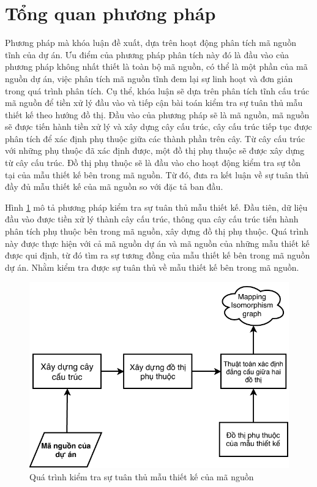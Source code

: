 \documentclass[12pt]{report}
\begin{document}
\section{Tổng quan phương pháp}
Phương pháp mà khóa luận đề xuất, dựa trên hoạt động phân tích mã nguồn tĩnh của dự án. Ưu điểm của phương pháp phân tích này đó là đầu vào của phương pháp không nhất thiết là toàn bộ mã nguồn, có thể là một phần của mã nguồn dự án, việc phân tích mã nguồn tĩnh đem lại sự linh hoạt và đơn giản trong quá trình phân tích. Cụ thể, khóa luận sẽ dựa trên phân tích tĩnh cấu trúc mã nguồn để tiền xử lý đầu vào và tiếp cận bài toán kiểm tra sự tuân thủ mẫu thiết kế theo hướng đồ thị.
Đầu vào của phương pháp sẽ là mã nguồn, mã nguồn sẽ được tiến hành tiền xử lý và xây dựng cây cấu trúc, cây cấu trúc tiếp tục được phân tích để xác định phụ thuộc giữa các thành phần trên cây. Từ cây cấu trúc với những phụ thuộc đã xác định được, một đồ thị phụ thuộc sẽ được xây dựng từ cây cấu trúc. Đồ thị phụ thuộc sẽ là đầu vào cho hoạt động kiểm tra sự tồn tại của mẫu thiết kế bên trong mã nguồn. Từ đó, đưa ra kết luận về sự tuân thủ đầy đủ mẫu thiết kế của mã nguồn so với đặc tả ban đầu.

\noindent Hình \ref{fig:general_architecture} mô tả phương pháp kiểm tra sự tuân thủ mẫu thiết kế. Đầu tiên, dữ liệu đầu vào được tiền xử lý thành cây cấu trúc, thông qua cây cấu trúc tiến hành phân tích phụ thuộc bên trong mã nguồn, xây dựng đồ thị phụ thuộc. Quá trình này được thực hiện với cả mã nguồn dự án và mã nguồn của những mẫu thiết kế được qui định, từ đó tìm ra sự tương đồng của mẫu thiết kế bên trong mã nguồn dự án. Nhằm kiểm tra được sự tuân thủ về mẫu thiết kế bên trong mã nguồn.
\begin{figure}[h]
	\centering
	\includegraphics[scale=1.1]{images/general_architecture_3_1_2}
	\caption{Quá trình kiểm tra sự tuân thủ mẫu thiết kế của mã nguồn}
	\label{fig:general_architecture}
\end{figure}
\end{document}

